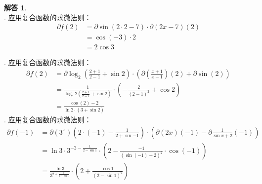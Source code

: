 \documentclass[12pt,UTF8]{ctexbook}
\theoremstyle{definition}
\newtheorem*{so}{解答}
\theoremstyle{plain}
\begin{document}
\begin{so}
    \mbox{} \\
    . 应用复合函数的求微法则：
    \begin{align*}
        \partial f(2) &= \partial \sin (2 \cdot 2 - 7) \cdot \partial (2x - 7) (2)  \\
        &= \cos{(-3)} \cdot 2  \\
        &= 2 \cos{3}   
    \end{align*}
    
    . 应用复合函数的求微法则：
    \begin{align*}
        \partial f(2) &= \partial \log_2 \left(\frac{2+1}{2-1} + \sin{2}\right) \cdot \left(\partial \left(\frac{x+1}{x-1}\right) (2) + \partial \sin (2) \right) \\
        &= \frac{1}{\log_{\mathrm{e}}{2} \left(\frac{2+1}{2-1} + \sin{2}\right)} \cdot \left( -\frac{2}{(2 - 1)^2} + \cos{2} \right)  \\
        &= \frac{\cos{(2)} - 2}{\ln{2} \cdot (3 + \sin{2})}   
    \end{align*}
    . 应用复合函数的求微法则：
    \begin{align*}
        \partial f(-1) &= \partial (3^x) (2\cdot (-1) - \frac{1}{2 + \sin{-1}}) \cdot \left(\partial (2x) (-1) - \partial \frac{1}{\sin{x} + 2} (-1) \right)  \\
        &= \ln{3} \cdot 3^{-2 - \frac{1}{2 - \sin{1}}} \cdot \left(2 - \frac{-1}{(\sin{(-1)} + 2)^2} \cdot \cos{(-1)} \right)  \\
        &= \frac{\ln{3}}{3^{2 + \frac{1}{2 - \sin{1}}}} \cdot \left(2 + \frac{\cos{1}}{(2 - \sin{1})^2}\right)  
    \end{align*}

\end{so}
\end{document}
